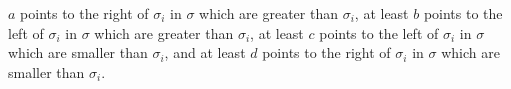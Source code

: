 \documentclass[
final,nomarks
]{dmtcs-episciences}
\begin{document}
\begin{math}a\end{math} points to the right of \begin{math}\sigma_i\end{math} in \begin{math}\sigma\end{math} which are greater than 
\begin{math}\sigma_i\end{math}, at least \begin{math}b\end{math} points to the left of \begin{math}\sigma_i\end{math} in \begin{math}\sigma\end{math} which 
are greater than \begin{math}\sigma_i\end{math},  at least \begin{math}c\end{math} points to the left of 
\begin{math}\sigma_i\end{math} in \begin{math}\sigma\end{math} which are smaller  than \begin{math}\sigma_i\end{math}, and 
at least \begin{math}d\end{math} points to the right of \begin{math}\sigma_i\end{math} in \begin{math}\sigma\end{math} which 
are smaller than \begin{math}\sigma_i\end{math}.
\end{document}
